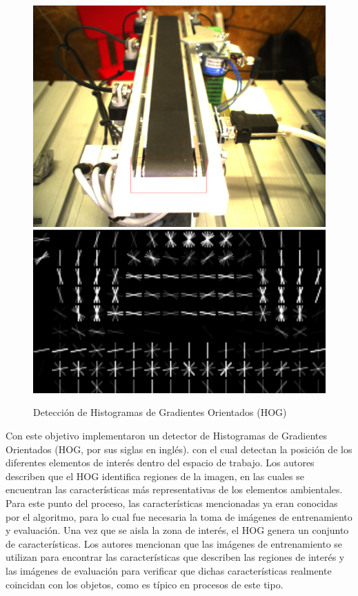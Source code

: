 \begin{figure}[H]
    \centering
    \includegraphics[scale=0.15]{Figures/Conveyor_GRIPS_TDP.png}     \includegraphics[scale=0.2]{Figures/Conveyor_HOG_GRIPS_TDP.png}
        \caption{Detección de Histogramas de Gradientes Orientados (HOG) \cite*{furbaß_robocup_2021}}
        \label{fig:HOG_GRIPS}
    \end{figure}

Con este objetivo implementaron un detector de Histogramas de Gradientes Orientados (HOG, por sus siglas en inglés). con el cual detectan la posición de los diferentes elementos de interés dentro del espacio de trabajo. Los autores describen que el HOG identifica regiones de la imagen, en las cuales se encuentran las características más representativas de los elementos ambientales. Para este punto del proceso, las características mencionadas ya eran conocidas por el algoritmo, para lo cual fue necesaria la toma de imágenes de entrenamiento y evaluación. Una vez que se aisla la zona de interés, el HOG genera un conjunto de características. Los autores mencionan que las imágenes de entrenamiento se utilizan para encontrar las características que describen las regiones de interés y las imágenes de evaluación para verificar que dichas características realmente coincidan con los objetos, como es típico en procesos de este tipo.

